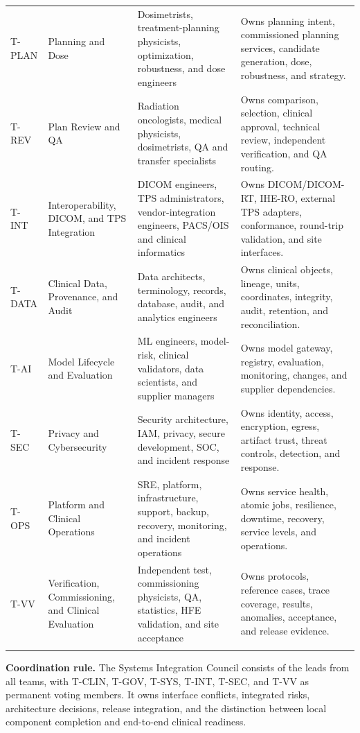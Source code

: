 \documentclass[11pt,letterpaper]{article}
\begin{document}
\begin{small}
\begin{longtable}{@{}L{0.11\textwidth}L{0.20\textwidth}L{0.34\textwidth}L{0.27\textwidth}@{}}
\addlinespace[2pt]
T-PLAN & Planning and Dose & Dosimetrists, treatment-planning physicists, optimization, robustness, and dose engineers & Owns planning intent, commissioned planning services, candidate generation, dose, robustness, and strategy. \\
\addlinespace[2pt]
T-REV & Plan Review and QA & Radiation oncologists, medical physicists, dosimetrists, QA and transfer specialists & Owns comparison, selection, clinical approval, technical review, independent verification, and QA routing. \\
\addlinespace[2pt]
T-INT & Interoperability, DICOM, and TPS Integration & DICOM engineers, TPS administrators, vendor-integration engineers, PACS\slash\allowbreak{}OIS and clinical informatics & Owns DICOM\slash\allowbreak{}DICOM-RT, IHE-RO, external TPS adapters, conformance, round-trip validation, and site interfaces. \\
\addlinespace[2pt]
T-DATA & Clinical Data, Provenance, and Audit & Data architects, terminology, records, database, audit, and analytics engineers & Owns clinical objects, lineage, units, coordinates, integrity, audit, retention, and reconciliation. \\
\addlinespace[2pt]
T-AI & Model Lifecycle and Evaluation & ML engineers, model-risk, clinical validators, data scientists, and supplier managers & Owns model gateway, registry, evaluation, monitoring, changes, and supplier dependencies. \\
\addlinespace[2pt]
T-SEC & Privacy and Cybersecurity & Security architecture, IAM, privacy, secure development, SOC, and incident response & Owns identity, access, encryption, egress, artifact trust, threat controls, detection, and response. \\
\addlinespace[2pt]
T-OPS & Platform and Clinical Operations & SRE, platform, infrastructure, support, backup, recovery, monitoring, and incident operations & Owns service health, atomic jobs, resilience, downtime, recovery, service levels, and operations. \\
\addlinespace[2pt]
T-VV & Verification, Commissioning, and Clinical Evaluation & Independent test, commissioning physicists, QA, statistics, HFE validation, and site acceptance & Owns protocols, reference cases, trace coverage, results, anomalies, acceptance, and release evidence. \\
\addlinespace[2pt]
\end{longtable}
\end{small}

\textbf{Coordination rule. }The Systems Integration Council consists of the leads from all teams, with T-CLIN, T-GOV, T-SYS, T-INT, T-SEC, and T-VV as permanent voting members. It owns interface conflicts, integrated risks, architecture decisions, release integration, and the distinction between local component completion and end-to-end clinical readiness.
\end{document}
